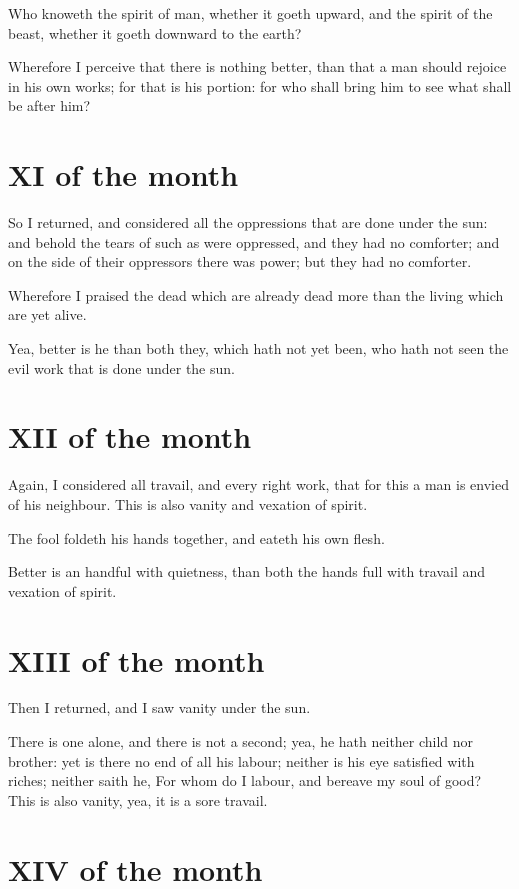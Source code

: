 \documentclass[0main.tex]{subfiles}
\begin{document}
Who knoweth the spirit of man, whether it goeth upward, and the spirit of the beast, whether it goeth downward to the earth?

Wherefore I perceive that there is nothing better, than that a man should rejoice in his own works; for that is his portion: for who shall bring him to see what shall be after him?

\section*{XI of the month}

So I returned, and considered all the oppressions that are done under the sun: and behold the tears of such as were oppressed, and they had no comforter; and on the side of their oppressors there was power; but they had no comforter.

Wherefore I praised the dead which are already dead more than the living which are yet alive.

Yea, better is he than both they, which hath not yet been, who hath not seen the evil work that is done under the sun.

\section*{XII of the month}

Again, I considered all travail, and every right work, that for this a man is envied of his neighbour. This is also vanity and vexation of spirit.

The fool foldeth his hands together, and eateth his own flesh.

Better is an handful with quietness, than both the hands full with travail and vexation of spirit.

\section*{XIII of the month}

Then I returned, and I saw vanity under the sun.

There is one alone, and there is not a second; yea, he hath neither child nor brother: yet is there no end of all his labour; neither is his eye satisfied with riches; neither saith he, For whom do I labour, and bereave my soul of good? This is also vanity, yea, it is a sore travail.

\section*{XIV of the month}
\end{document}
